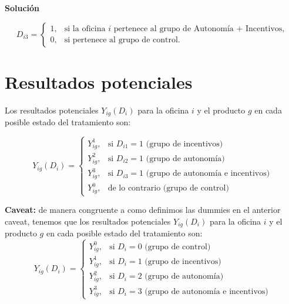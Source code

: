 \documentclass[a4paper, answers, addpoints, 11pt]{exam}
\newenvironment{solucion}{%
  \begin{mdframed}[
    backgroundcolor=blue!5,    %
    linecolor=blue!50,          %
    linewidth=2pt,              %
    leftmargin=10pt,            %
    rightmargin=10pt,           %
    topline=true,              %
    bottomline=true,            %
    roundcorner=10pt,           %
    innerleftmargin=10pt,       %
    innerrightmargin=10pt,      %
    innerbottommargin=10pt,     %
    innertopmargin=10pt         %
  ]%
  \begin{tcolorbox}[colframe=blue!50!black, colback=blue!50, coltitle=white, sharp corners=all, boxrule=1mm, width=\textwidth, halign=left, valign=center, top=0mm, bottom=0mm, left=0mm, right=0mm] \textbf{Solución} \end{tcolorbox} }{\end{mdframed}}
\begin{document}
\begin{enumerate}
\begin{solucion}
\begin{mdframed}[backgroundcolor=moraditoClaro]
\begin{equation*}
D_{i3} =
\begin{cases}
    1, & \text{si la oficina } i \text{ pertenece al grupo de Autonomía + Incentivos}, \\
    0, & \text{si pertenece al grupo de control}.
\end{cases}
\end{equation*}
\end{mdframed}
  \section*{Resultados potenciales} 
Los resultados potenciales $Y_{ig}(D_i)$ para la oficina $i$ y el producto $g$ en cada posible estado del tratamiento son:

\begin{equation*}
    Y_{ig}(D_i) = \begin{cases}
        Y_{ig}^1, & \text{si $D_{i1} = 1$ (grupo de incentivos)} \\
        Y_{ig}^2, & \text{si $D_{i2} = 1$ (grupo de autonomía)} \\
        Y_{ig}^3, & \text{si $D_{i3} = 1$ (grupo de autonomía e incentivos)}\\
         Y_{ig}^0, & \text{de lo contrario (grupo de control)} 
    \end{cases}
\end{equation*}

\begin{mdframed}[backgroundcolor=moraditoClaro]
\textbf{Caveat:}   de manera congruente a como definimos las dummies en el anterior caveat, tenemos que los resultados potenciales $Y_{ig}(D_i)$ para la oficina $i$ y el producto $g$ en cada posible estado del tratamiento son:
\begin{equation*}
 Y_{ig}(D_i) = \begin{cases}
        Y_{ig}^0, & \text{si $D_i = 0$ (grupo de control)} \\
        Y_{ig}^1, & \text{si $D_i = 1$ (grupo de incentivos)} \\
        Y_{ig}^2, & \text{si $D_i = 2$ (grupo de autonomía)} \\
        Y_{ig}^3, & \text{si $D_i = 3$ (grupo de autonomía e incentivos)}
    \end{cases}
\end{equation*}
        \end{mdframed}
         \end{solucion}
   

\end{enumerate}
\end{document}
